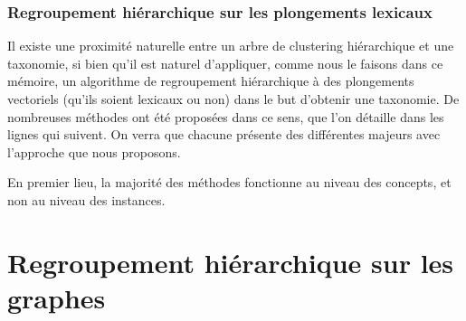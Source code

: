 \subsubsection{Regroupement hiérarchique sur les plongements lexicaux}


Il existe une proximité naturelle entre un arbre de clustering hiérarchique et une taxonomie, si bien qu'il est naturel d'appliquer, comme nous le faisons dans ce mémoire, un algorithme de regroupement hiérarchique à des plongements vectoriels (qu'ils soient lexicaux ou non) dans le but d'obtenir une taxonomie.  De nombreuses méthodes ont été proposées dans ce sens, que l'on détaille dans les lignes qui suivent. On verra que chacune présente des différentes majeurs avec l'approche que nous proposons.


En premier lieu, la majorité des méthodes fonctionne au niveau des concepts, et non au niveau des instances.


\section{Regroupement hiérarchique sur les graphes}
